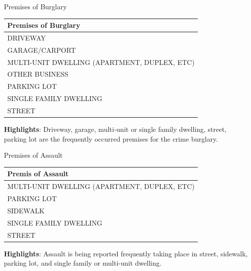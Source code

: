\documentclass{beamer}\usepackage[]{graphicx}\usepackage[]{xcolor}
\newenvironment{knitrout}{}{} %
\begin{document}
\begin{frame}[fragile]{Premises of Burglary}
\begin{knitrout}
\color{fgcolor}
\begin{tabular}{l}
\hline
Premises of Burglary\\
\hline
DRIVEWAY\\
\hline
GARAGE/CARPORT\\
\hline
MULTI-UNIT DWELLING (APARTMENT, DUPLEX, ETC)\\
\hline
OTHER BUSINESS\\
\hline
PARKING LOT\\
\hline
SINGLE FAMILY DWELLING\\
\hline
STREET\\
\hline
\end{tabular}

\end{knitrout}
\vspace{0.5cm}
\textbf{Highlights}: Driveway, garage, multi-unit or single family dwelling, street, parking lot are the frequently occurred premises for the crime burglary.

\end{frame}


\begin{frame}[fragile]{Premises of Assault}
\begin{knitrout}
\color{fgcolor}
\begin{tabular}{l}
\hline
Premis of Assault\\
\hline
MULTI-UNIT DWELLING (APARTMENT, DUPLEX, ETC)\\
\hline
PARKING LOT\\
\hline
SIDEWALK\\
\hline
SINGLE FAMILY DWELLING\\
\hline
STREET\\
\hline
\end{tabular}

\end{knitrout}
\vspace{0.5cm}
\textbf{Highlights}: Assault is being reported frequently taking place in street, sidewalk, parking lot, and single family or multi-unit dwelling.
\end{frame}
\end{document}
